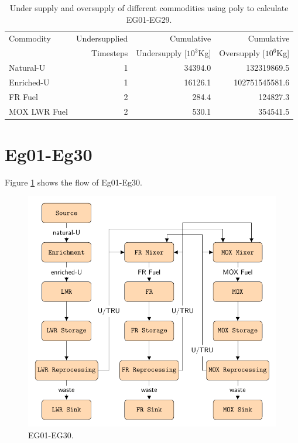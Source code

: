 \documentclass[11pt]{article}
\begin{document}
\begin{table}[H]
	\centering
	\caption{Under supply and oversupply of different commodities using poly to calculate EG01-EG29.}
	\label{tab:29-commod}
	\begin{tabularx}{\textwidth}{lRRR}
		\hline
		Commodity & Undersupplied & Cumulative  & Cumulative \\
		& Timesteps & Undersupply [$10^3$Kg]  & Oversupply [$10^6$Kg] \\ \hline
		Natural-U & 1 & 34394.0  & 132319869.5 \\ 
		Enriched-U & 1 & 16126.1 & 102751545581.6 \\
		FR Fuel & 2 & 284.4 & 124827.3 \\
        MOX LWR Fuel & 2 & 530.1 & 354541.5 \\ \hline
	\end{tabularx}
\end{table}

\section{Eg01-Eg30}

Figure \ref{fig:30flow} shows the flow of Eg01-Eg30.

\begin{figure}[H]
	\centering
	\includegraphics[width=\textwidth]{30-figures/30flow.pdf} 
	\hfill
	\caption{EG01-EG30.}
	\label{fig:30flow}
\end{figure}
\end{document}
